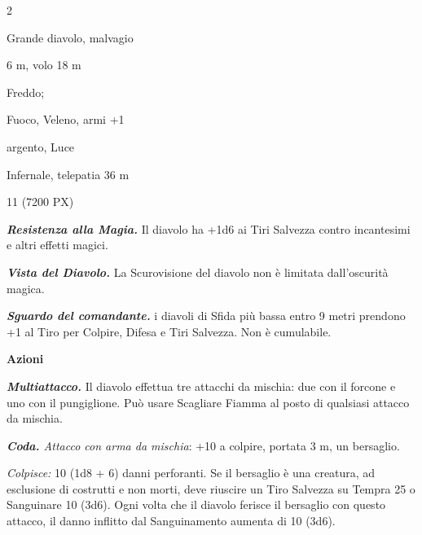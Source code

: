 \begin{multicols}{2}
{
\begin{description}[noitemsep, topsep=0pt, parsep=0pt, partopsep=0pt, itemsep=1pt, leftmargin=2.35cm,  labelwidth=2.2cm, itemindent=0cm, listparindent=0pt] %
\setlength{\baselineskip}{10pt}
\item[\textbf{Taglia/Tipo}] Grande diavolo, malvagio
\item[\textbf{Caratt.}] 
\item[\textbf{Punti Ferita}] 
\item[\textbf{Movimento}] 6 m, volo 18 m
\item[\textbf{Tiri Salvez.}] 
\item[\textbf{Res. Danni}] Freddo;
\item[\textbf{Imm. Danni}] Fuoco, Veleno, armi +1
\item[\textbf{Vulnerabilità}] argento, Luce
\item[\textbf{Sensi}] 
\item[\textbf{Linguaggi}] Infernale, telepatia 36 m
\item[\textbf{Sfida}] 11 (7200 PX)
\end{description}
\smallskip

\emph{\textbf{Resistenza alla Magia.}} Il diavolo ha +1d6 ai Tiri Salvezza contro incantesimi e altri effetti magici.

\emph{\textbf{Vista del Diavolo.}} La Scurovisione del diavolo non è limitata dall'oscurità magica.

\emph{\textbf{Sguardo del comandante.}} i diavoli di Sfida più bassa entro 9 metri prendono +1 al Tiro per Colpire, Difesa e Tiri Salvezza. Non è cumulabile.

\textbf{Azioni}

\emph{\textbf{Multiattacco.}} Il diavolo effettua tre attacchi da mischia: due con il forcone e uno con il pungiglione. Può usare Scagliare Fiamma al posto di qualsiasi attacco da mischia.

\emph{\textbf{Coda.} Attacco con arma da mischia}: +10 a colpire, portata 3 m, un bersaglio.

\emph{Colpisce:} 10 (1d8 + 6) danni perforanti. Se il bersaglio è una creatura, ad esclusione di costrutti e non morti, deve riuscire un Tiro Salvezza su Tempra 25 o Sanguinare 10 (3d6). Ogni volta che il diavolo ferisce il bersaglio con questo attacco, il danno inflitto dal Sanguinamento aumenta di 10 (3d6).

}
\end{multicols}

